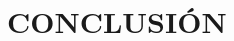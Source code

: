 \documentclass[conference]{IEEEtran}
\newcommand{\C}{\mathbb{C}}  %
\begin{document}
% 
%
%

\section{CONCLUSIÓN} \label{sec:concl} 

\end{document}
